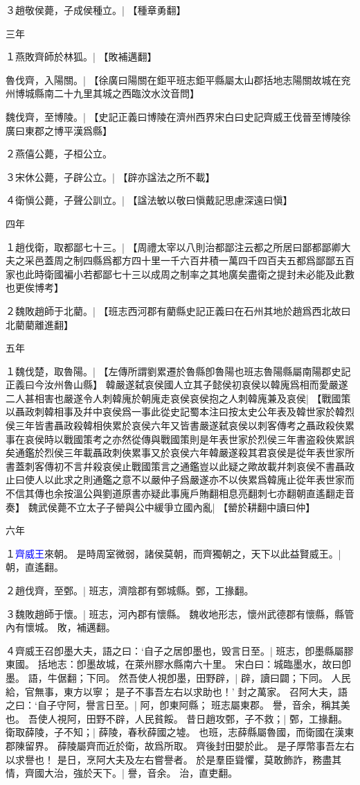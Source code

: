 ３趙敬侯薨，子成侯種立。|{
	【種章勇翻】}

	三年

１燕敗齊師於林狐。|{
	【敗補邁翻】}

魯伐齊，入陽關。|{
	【徐廣曰陽關在鉅平班志鉅平縣屬太山郡括地志陽關故城在兖州博城縣南二十九里其城之西臨汶水汶音問】}

魏伐齊，至博陵。|{
	【史記正義曰博陵在濟州西界宋白曰史記齊威王伐晉至博陵徐廣曰東郡之博平漢爲縣】}

２燕僖公薨，子桓公立。

３宋休公薨，子辟公立。|{
	【辟亦諡法之所不載】}

４衛愼公薨，子聲公訓立。|{
	【諡法敏以敬曰愼戴記思慮深遠曰愼】
	}


	四年

１趙伐衛，取都鄙七十三。|{
	【周禮太宰以八則治都鄙注云都之所居曰鄙都鄙卿大夫之采邑蓋周之制四縣爲都方四十里一千六百井積一萬四千四百夫五都爲鄙鄙五百家也此時衛國褊小若都鄙七十三以成周之制率之其地廣矣盡衛之提封未必能及此數也更俟博考】}

２魏敗趙師于北藺。|{
	【班志西河郡有藺縣史記正義曰在石州其地於趙爲西北故曰北藺藺離進翻】}


	五年

１魏伐楚，取魯陽。|{
	【左傳所謂劉累遷於魯縣卽魯陽也班志魯陽縣屬南陽郡史記正義曰今汝州魯山縣】}
韓嚴遂弑哀侯國人立其子懿侯初哀侯以韓廆爲相而愛嚴遂二人甚相害也嚴遂令人刺韓廆於朝廆走哀侯哀侯抱之人刺韓廆兼及哀侯|{
	【戰國策以聶政刺韓相事及幷中哀侯爲一事此從史記蜀本注曰按太史公年表及韓世家於韓烈侯三年皆書聶政殺韓相俠累於哀侯六年又皆書嚴遂弑哀侯以刺客傳考之聶政殺俠累事在哀侯時以戰國策考之亦然從傳與戰國策則是年表世家於烈侯三年書盗殺俠累誤矣通鑑於烈侯三年載聶政刺俠累事又於哀侯六年韓嚴遂殺其君哀侯是從年表世家所書蓋刺客傳初不言幷殺哀侯止戰國策言之通鑑豈以此疑之歟故載幷刺哀侯不書聶政止曰使人以此求之則通鑑之意不以嚴仲子爲嚴遂亦不以俠累爲韓廆止從年表世家而不信其傳也余按溫公與劉道原書亦疑此事廆戶賄翻相息亮翻刺七亦翻朝直遙翻走音奏】}
魏武侯薨不立太子子罃與公中緩爭立國內亂|{
	【罃於耕翻中讀曰仲】}


六年

１\textcolor{blue}{齊威王}來朝。
是時周室微弱，諸侯莫朝，而齊獨朝之，天下以此益賢威王。|{
	朝，直遙翻。
	}

２趙伐齊，至鄄。|{
	班志，濟陰郡有鄄城縣。鄄，工掾翻。
	}

３魏敗趙師于懷。|{
	班志，河內郡有懷縣。
	魏收地形志，懷州武德郡有懷縣，縣管內有懷城。
	敗，補邁翻。
	}

４齊威王召卽墨大夫，語之曰：‘自子之居卽墨也，毁言日至。|{
	班志，卽墨縣屬膠東國。
	括地志：卽墨故城，在萊州膠水縣南六十里。
	宋白曰：城臨墨水，故曰卽墨。
	語，牛倨翻；下同。
	}
然吾使人視卽墨，田野辟，|{
	辟，讀曰闢；下同。
	}
人民給，官無事，東方以寧；
是子不事吾左右以求助也！’
封之萬家。
召阿大夫，語之曰：‘自子守阿，譽言日至。|{
	阿，卽東阿縣；
	班志屬東郡。
	譽，音余，稱其美也。
	}
吾使人視阿，田野不辟，人民貧餒。
昔日趙攻鄄，子不救；|{
	鄄，工掾翻。
	}
衛取薛陵，子不知；|{
	薛陵，春秋薛國之墟。
	也班，志薛縣屬魯國，而衛國在漢東郡陳留界。
	薛陵屬齊而近於衛，故爲所取。
	齊後封田嬰於此。
	}
是子厚幣事吾左右以求譽也！
是日，烹阿大夫及左右嘗譽者。
於是羣臣聳懼，莫敢飾詐，務盡其情，齊國大治，強於天下。|{
	譽，音余。
	治，直吏翻。
	}

